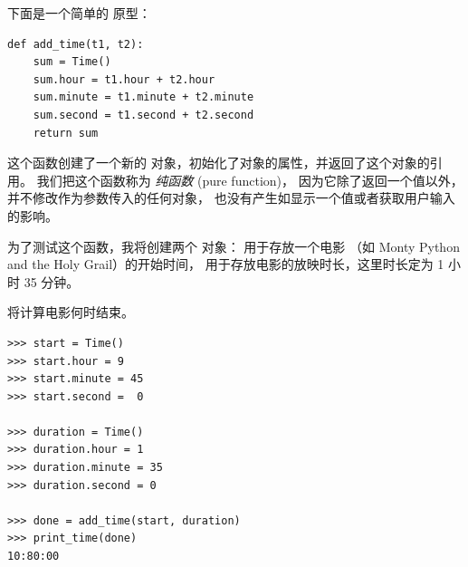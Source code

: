 {下面是一个简单的  原型：

\begin{lstlisting}
def add_time(t1, t2):
    sum = Time()
    sum.hour = t1.hour + t2.hour
    sum.minute = t1.minute + t2.minute
    sum.second = t1.second + t2.second
    return sum
\end{lstlisting}


这个函数创建了一个新的 
对象，初始化了对象的属性，并返回了这个对象的引用。
我们把这个函数称为 {\em 纯函数} (pure function)，
因为它除了返回一个值以外， 并不修改作为参数传入的任何对象，
也没有产生如显示一个值或者获取用户输入的影响。

  




为了测试这个函数，我将创建两个  对象：  用于存放一个电影
（如 Monty Python and the Holy Grail）的开始时间，  用于存放电影的放映时长，这里时长定为 1 小时 35 分钟。

 将计算电影何时结束。


\begin{lstlisting}
>>> start = Time()
>>> start.hour = 9
>>> start.minute = 45
>>> start.second =  0

>>> duration = Time()
>>> duration.hour = 1
>>> duration.minute = 35
>>> duration.second = 0

>>> done = add_time(start, duration)
>>> print_time(done)
10:80:00
\end{lstlisting}


}
